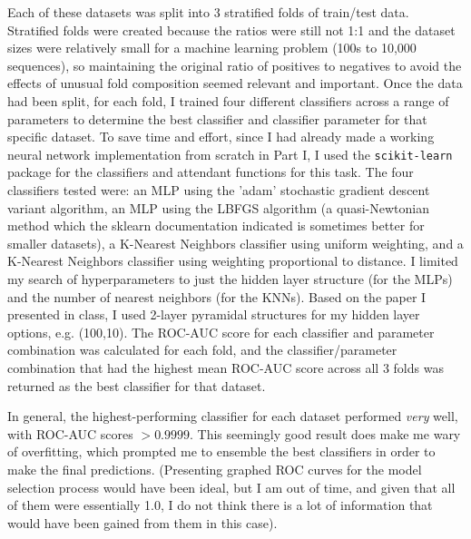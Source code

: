 \documentclass[12pt]{article}
\begin{document}
Each of these datasets was split into 3 stratified folds of train/test data. Stratified folds were created because the ratios were still not 1:1 and the dataset sizes were relatively small for a machine learning problem (100s to 10,000 sequences), so maintaining the original ratio of positives to negatives to avoid the effects of unusual fold composition seemed relevant and important. Once the data had been split, for each fold, I trained four different classifiers across a range of parameters to determine the best classifier and classifier parameter for that specific dataset. To save time and effort, since I had already made a working neural network implementation from scratch in Part I, I used the \verb|scikit-learn| package for the classifiers and attendant functions for this task. The four classifiers tested were: an MLP using the 'adam' stochastic gradient descent variant algorithm, an MLP using the LBFGS algorithm (a quasi-Newtonian method which the sklearn documentation indicated is sometimes better for smaller datasets), a K-Nearest Neighbors classifier using uniform weighting, and a K-Nearest Neighbors classifier using weighting proportional to distance. I limited my search of hyperparameters to just the hidden layer structure (for the MLPs) and the number of nearest neighbors (for the KNNs). Based on the paper I presented in class, I used 2-layer pyramidal structures for my hidden layer options, e.g. (100,10). The ROC-AUC score for each classifier and parameter combination was calculated for each fold, and the classifier/parameter combination that had the highest mean ROC-AUC score across all 3 folds was returned as the best classifier for that dataset. 
\par In general, the highest-performing classifier for each dataset performed {\it very} well, with ROC-AUC scores $>0.9999$. This seemingly good result does make me wary of overfitting, which prompted me to ensemble the best classifiers in order to make the final predictions. (Presenting graphed ROC curves for the model selection process would have been ideal, but I am out of time, and given that all of them were essentially 1.0, I do not think there is a lot of information that would have been gained from them in this case).
\end{document}
